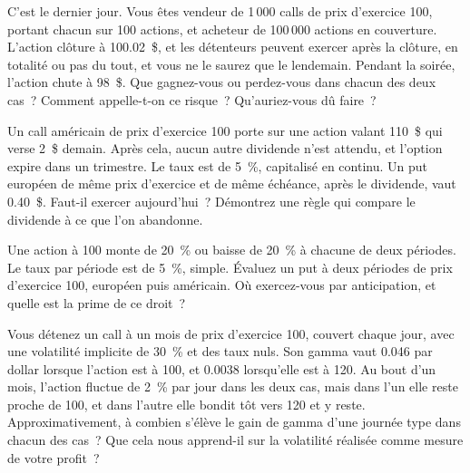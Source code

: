 \begin{question}\label{iq:iv2:options-parity-and-greeks:36}
C'est le dernier jour. Vous êtes vendeur de 1\,000 calls de prix d'exercice 100, portant chacun sur 100 actions, et acheteur de 100\,000 actions en couverture. L'action clôture à 100.02~\$, et les détenteurs peuvent exercer après la clôture, en totalité ou pas du tout, et vous ne le saurez que le lendemain. Pendant la soirée, l'action chute à 98~\$. Que gagnez-vous ou perdez-vous dans chacun des deux cas~? Comment appelle-t-on ce risque~? Qu'auriez-vous dû faire~?
\end{question}

\begin{question}\label{iq:iv2:options-parity-and-greeks:37}
Un call américain de prix d'exercice 100 porte sur une action valant 110~\$ qui verse 2~\$ demain. Après cela, aucun autre dividende n'est attendu, et l'option expire dans un trimestre. Le taux est de 5~\%, capitalisé en continu. Un put européen de même prix d'exercice et de même échéance, après le dividende, vaut 0.40~\$. Faut-il exercer aujourd'hui~? Démontrez une règle qui compare le dividende à ce que l'on abandonne.
\end{question}

\begin{question}\label{iq:iv2:options-parity-and-greeks:38}
Une action à 100 monte de 20~\% ou baisse de 20~\% à chacune de deux périodes. Le taux par période est de 5~\%, simple. Évaluez un put à deux périodes de prix d'exercice 100, européen puis américain. Où exercez-vous par anticipation, et quelle est la prime de ce droit~?
\end{question}

\begin{question}\label{iq:iv2:options-parity-and-greeks:39}
Vous détenez un call à un mois de prix d'exercice 100, couvert chaque jour, avec une volatilité implicite de 30~\% et des taux nuls. Son gamma vaut 0.046 par dollar lorsque l'action est à 100, et 0.0038 lorsqu'elle est à 120. Au bout d'un mois, l'action fluctue de 2~\% par jour dans les deux cas, mais dans l'un elle reste proche de 100, et dans l'autre elle bondit tôt vers 120 et y reste. Approximativement, à combien s'élève le gain de gamma d'une journée type dans chacun des cas~? Que cela nous apprend-il sur la volatilité réalisée comme mesure de votre profit~?
\end{question}

